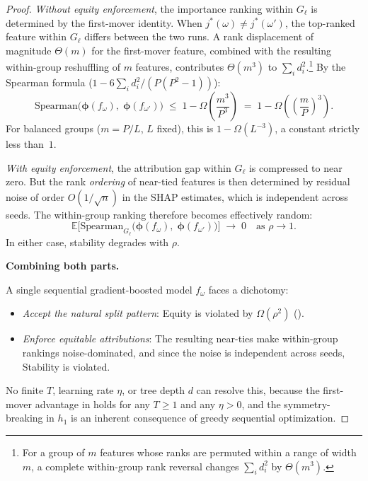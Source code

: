\documentclass[11pt]{article}
\theoremstyle{remark}
\newcommand{\Gl}{G_\ell}                    %
\newcommand{\totalT}{T}                     %
\newcommand{\rhovar}{\rho}                  %
\newcommand{\Exp}{\mathbb{E}}              %
\begin{document}
\begin{proof}
\emph{Without equity enforcement}, the importance ranking within $\Gl$ is
determined by the first-mover identity.  When
$j^*(\omega) \neq j^*(\omega')$, the top-ranked feature within $\Gl$
differs between the two runs.  A rank displacement of magnitude $\Theta(m)$
for the first-mover feature, combined with the resulting within-group
reshuffling of $m$ features, contributes $\Theta(m^3)$ to
$\sum_i d_i^2$.\footnote{For a group of $m$ features whose ranks are
  permuted within a range of width $m$, a complete within-group rank
  reversal changes $\sum_i d_i^2$ by $\Theta(m^3)$.}
By the Spearman formula ($1 - 6\sum_i d_i^2 / (P(P^2-1))$):
\begin{equation}
  \mathrm{Spearman}\bigl(\boldsymbol{\phi}(f_\omega),\;
    \boldsymbol{\phi}(f_{\omega'})\bigr)
  \;\leq\; 1 - \Omega\!\left(\frac{m^3}{P^3}\right)
  \;=\; 1 - \Omega\!\left(\!\left(\frac{m}{P}\right)^{\!3}\right).
\end{equation}
For balanced groups ($m = P/L$, $L$ fixed), this is $1 - \Omega(L^{-3})$,
a constant strictly less than~$1$.

\emph{With equity enforcement}, the attribution gap within $\Gl$ is
compressed to near zero.  But the rank \emph{ordering} of near-tied
features is then determined by residual noise of order
$O(1/\sqrt{n})$ in the SHAP estimates, which is independent across
seeds.  The within-group ranking therefore becomes effectively random:
\begin{equation}
  \Exp\bigl[\mathrm{Spearman}_{\Gl}\bigl(
    \boldsymbol{\phi}(f_\omega),\;
    \boldsymbol{\phi}(f_{\omega'})
  \bigr)\bigr] \;\to\; 0
  \quad \text{as } \rhovar \to 1.
\end{equation}
In either case, stability degrades with $\rhovar$.

\medskip
\noindent\textbf{Combining both parts.}

A single sequential gradient-boosted model $f_\omega$ faces a dichotomy:
\begin{itemize}
  \item \emph{Accept the natural split pattern}: Equity is violated by
    $\Omega(\rhovar^2)$ ().
  \item \emph{Enforce equitable attributions}: The resulting near-ties
    make within-group rankings noise-dominated, and since the noise is
    independent across seeds, Stability is violated.
\end{itemize}
No finite $\totalT$, learning rate $\eta$, or tree depth $d$ can resolve
this, because the first-mover advantage in
 holds for any $\totalT \geq 1$ and any
$\eta > 0$, and the symmetry-breaking in $h_1$ is an inherent
consequence of greedy sequential optimization.
\end{proof}
\end{document}
